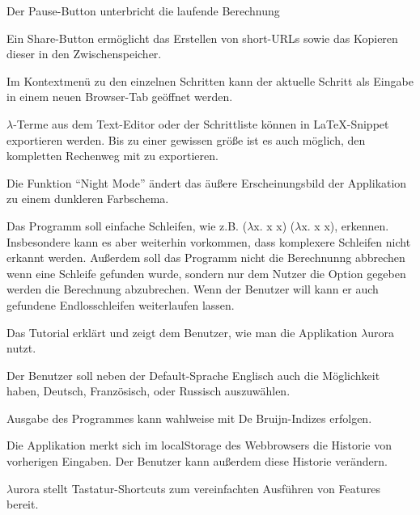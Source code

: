 \documentclass[parskip=full,11pt,twoside]{scrartcl}
\begin{document}
Der Pause-Button unterbricht die laufende Berechnung

Ein Share-Button ermöglicht das Erstellen von short-URLs sowie das Kopieren dieser in den Zwischenspeicher.

Im Kontextmenü zu den einzelnen Schritten kann der aktuelle Schritt als Eingabe in einem neuen Browser-Tab geöffnet werden.

$\lambda$-Terme aus dem Text-Editor oder der Schrittliste können in LaTeX-Snippet exportieren werden. Bis zu einer gewissen größe ist es auch möglich, den kompletten Rechenweg mit zu exportieren.

Die Funktion \enquote{Night Mode} ändert das äußere Erscheinungsbild der Applikation zu einem dunkleren Farbschema.

Das Programm soll einfache Schleifen, wie z.B. ($\lambda$x. x x) ($\lambda$x. x x), erkennen. Insbesondere kann es aber weiterhin vorkommen, dass komplexere Schleifen nicht erkannt werden.
Außerdem soll das Programm nicht die Berechnunng abbrechen wenn eine Schleife gefunden wurde, sondern nur dem Nutzer die Option gegeben werden die Berechnung abzubrechen. Wenn der Benutzer  will kann er auch gefundene Endlosschleifen weiterlaufen lassen.

Das Tutorial erklärt und zeigt dem Benutzer, wie man die Applikation $\lambda$urora nutzt.

Der Benutzer soll neben der Default-Sprache Englisch auch die Möglichkeit haben, Deutsch, Französisch, oder Russisch auszuwählen.

Ausgabe des Programmes kann wahlweise mit De Bruijn-Indizes erfolgen.

Die Applikation merkt sich im localStorage des Webbrowsers die Historie von vorherigen Eingaben. Der Benutzer kann außerdem diese Historie verändern.

$\lambda$urora stellt Tastatur-Shortcuts zum vereinfachten Ausführen von Features bereit.
\end{document}
